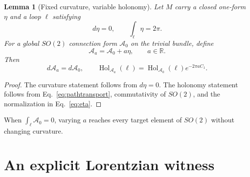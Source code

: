 \documentclass[10pt,oneside]{article}
\theoremstyle{plaincompact}
\newtheorem{lemma}[theorem]{Lemma}
\theoremstyle{definitioncompact}
\newcommand{\R}{\mathbb R}
\newcommand{\Hol}{\operatorname{Hol}}
\newcommand{\Ad}{\mathcal A}
\begin{document}
\begin{lemma}[Fixed curvature, variable holonomy]\label{lem:tuning}
Let $M$ carry a closed one-form $\eta$ and a loop $\ell$ satisfying
\begin{equation}\label{eq:eta}
d\eta=0,\qquad \int_\ell\eta=2\pi.
\end{equation}
For a global $SO(2)$ connection form $\Ad_0$ on the trivial bundle, define
\begin{equation}\label{eq:Aa}
\Ad_a=\Ad_0+a\eta,\qquad a\in\R.
\end{equation}
Then
\begin{equation}\label{eq:tuning}
d\Ad_a=d\Ad_0,\qquad
\Hol_{\Ad_a}(\ell)=\Hol_{\Ad_0}(\ell)e^{-2\pi aC_1}.
\end{equation}
\end{lemma}

\begin{proof}
The curvature statement follows from $d\eta=0$.  The holonomy statement
follows from Eq.~\eqref{eq:pathtransport}, commutativity of $SO(2)$, and the
normalization in Eq.~\eqref{eq:eta}.
\end{proof}

When $\int_\ell\Ad_0=0$, varying $a$ reaches every target element of $SO(2)$
without changing curvature.

\section{An explicit Lorentzian witness}
\end{document}
